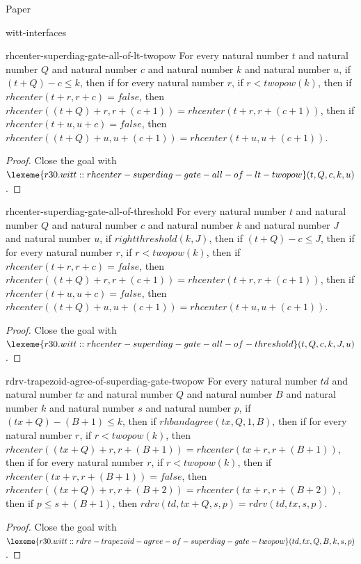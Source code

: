 \begin{lexlean}{Paper}
\begin{section}{witt-interfaces}
  \begin{theorem}{rhcenter-superdiag-gate-all-of-lt-twopow}
  For every natural number \(t\) and natural number \(Q\) and natural number \(c\) and natural number \(k\) and natural number \(u\), if \((t + Q) - c ≤ k\), then if for every natural number \(r\), if \(r < twopow(k)\), then if \(rhcenter(t + r, r + c) = false\), then \(rhcenter((t + Q) + r, r + (c + 1)) = rhcenter(t + r, r + (c + 1))\), then if \(rhcenter(t + u, u + c) = false\), then \(rhcenter((t + Q) + u, u + (c + 1)) = rhcenter(t + u, u + (c + 1))\).
  \begin{proof}
  Close the goal with \(\lexeme{r30.witt::rhcenter-superdiag-gate-all-of-lt-twopow}(t, Q, c, k, u)\).
  \end{proof}
  \end{theorem}

  \begin{theorem}{rhcenter-superdiag-gate-all-of-threshold}
  For every natural number \(t\) and natural number \(Q\) and natural number \(c\) and natural number \(k\) and natural number \(J\) and natural number \(u\), if \(rightthreshold(k, J)\), then if \((t + Q) - c ≤ J\), then if for every natural number \(r\), if \(r < twopow(k)\), then if \(rhcenter(t + r, r + c) = false\), then \(rhcenter((t + Q) + r, r + (c + 1)) = rhcenter(t + r, r + (c + 1))\), then if \(rhcenter(t + u, u + c) = false\), then \(rhcenter((t + Q) + u, u + (c + 1)) = rhcenter(t + u, u + (c + 1))\).
  \begin{proof}
  Close the goal with \(\lexeme{r30.witt::rhcenter-superdiag-gate-all-of-threshold}(t, Q, c, k, J, u)\).
  \end{proof}
  \end{theorem}

  \begin{theorem}{rdrv-trapezoid-agree-of-superdiag-gate-twopow}
  For every natural number \(td\) and natural number \(tx\) and natural number \(Q\) and natural number \(B\) and natural number \(k\) and natural number \(s\) and natural number \(p\), if \((tx + Q) - (B + 1) ≤ k\), then if \(rhbandagree(tx, Q, 1, B)\), then if for every natural number \(r\), if \(r < twopow(k)\), then \(rhcenter((tx + Q) + r, r + (B + 1)) = rhcenter(tx + r, r + (B + 1))\), then if for every natural number \(r\), if \(r < twopow(k)\), then if \(rhcenter(tx + r, r + (B + 1)) = false\), then \(rhcenter((tx + Q) + r, r + (B + 2)) = rhcenter(tx + r, r + (B + 2))\), then if \(p ≤ s + (B + 1)\), then \(rdrv(td, tx + Q, s, p) = rdrv(td, tx, s, p)\).
  \begin{proof}
  Close the goal with \(\lexeme{r30.witt::rdrv-trapezoid-agree-of-superdiag-gate-twopow}(td, tx, Q, B, k, s, p)\).
  \end{proof}
  \end{theorem}


\end{section}
\end{lexlean}
